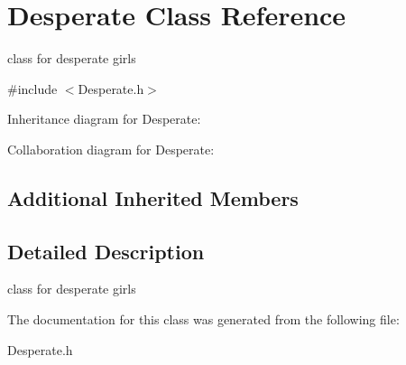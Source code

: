 \hypertarget{classDesperate}{}\section{Desperate Class Reference}
\label{classDesperate}


class for desperate girls  




{\ttfamily \#include $<$Desperate.\+h$>$}



Inheritance diagram for Desperate\+:


Collaboration diagram for Desperate\+:
\subsection*{Additional Inherited Members}


\subsection{Detailed Description}
class for desperate girls 

The documentation for this class was generated from the following file\+:\begin{DoxyCompactItemize}
\item 
Desperate.\+h\end{DoxyCompactItemize}

